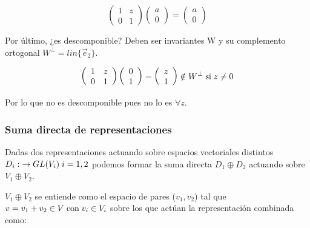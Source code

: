\documentclass{article}
\begin{document}
    $$\left ( \begin{array}{cc}
        1 & z \\
        0 & 1
    \end{array}\right) \left( \begin{array}{c}
         a  \\
         0 
    \end{array}\right)=  \left( \begin{array}{c}
         a  \\
         0 
    \end{array}\right)$$
    
    \smallskip
    Por último, ¿es descomponible? Deben ser invariantes W y su complemento ortogonal $W^\bot =lin \lbrace \Vec{e}_2 \rbrace$.
    
    $$\left ( \begin{array}{cc}
        1 & z \\
        0 & 1
    \end{array}\right) \left( \begin{array}{c}
         0  \\
         1 
    \end{array}\right)=  \left( \begin{array}{c}
         z  \\
         1 
    \end{array}\right) \notin W^\bot \hspace{0.1cm} \text{si} \hspace{0.1cm} z\neq 0$$
    
    
    Por lo que no es descomponible pues no lo es $\forall z$.
    
    \newpage
    \subsubsection{Suma directa de representaciones}
    
    Dadas dos representaciones actuando sobre espacios vectoriales distintos $D_i: \hspace{0.1cm} \to GL(V_i)\hspace{0.1cm} i=1,2$ podemos formar la suma directa $D_1\oplus D_2$ actuando sobre $V_1 \oplus V_2$.
    
    $V_1 \oplus V_2$ se entiende como el espacio de pares ($v_1,v_2$) tal que $v=v_1+v_2 \in V \hspace{0.1cm} \text{con} \hspace{0.1cm} v_i\in V_i$ sobre los que actúan la representación combinada como:
    
\end{document}
